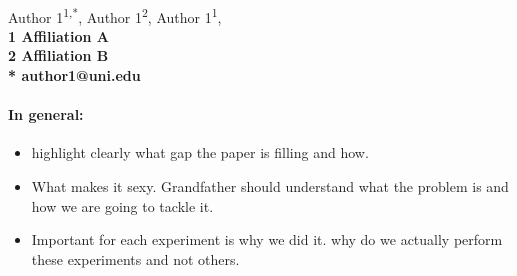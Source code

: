 \documentclass[10pt,letterpaper]{article}
\begin{document}
\vspace*{0.35in}

\begin{flushleft}
{\Large
\textbf{}
}
\newline
\\
Author 1\textsuperscript{1,*},
Author 1\textsuperscript{2},
Author 1\textsuperscript{1},
\\
\bigskip
\bf{1} Affiliation A
\\
\bf{2} Affiliation B
\\
\bigskip
* author1@uni.edu

\end{flushleft}



\linenumbers



\paragraph{In general:}

 \begin{itemize}
     \item highlight clearly what gap the paper is filling and how. 
     \item What makes it sexy. Grandfather should understand what the problem is and how we are going to tackle it.
     \item  Important for each experiment is why we did it. why do we actually perform these experiments and not others. 
 \end{itemize}





\end{document}
